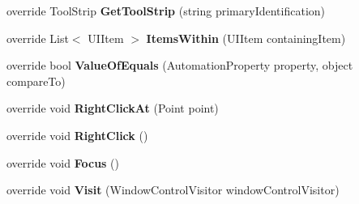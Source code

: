 \begin{DoxyCompactItemize}
\item 
\hypertarget{class_proto_test_1_1_golem_1_1_white_1_1_elements_1_1_white_group_box_a5552ee58d6ee1cba644c05b8be0002fe}{override Tool\-Strip {\bfseries Get\-Tool\-Strip} (string primary\-Identification)}\label{class_proto_test_1_1_golem_1_1_white_1_1_elements_1_1_white_group_box_a5552ee58d6ee1cba644c05b8be0002fe}

\item 
\hypertarget{class_proto_test_1_1_golem_1_1_white_1_1_elements_1_1_white_group_box_a7e122903b49b4a13e8490163f43d9711}{override List$<$ U\-I\-Item $>$ {\bfseries Items\-Within} (U\-I\-Item containing\-Item)}\label{class_proto_test_1_1_golem_1_1_white_1_1_elements_1_1_white_group_box_a7e122903b49b4a13e8490163f43d9711}

\item 
\hypertarget{class_proto_test_1_1_golem_1_1_white_1_1_elements_1_1_white_group_box_ac233cfda25110a0ec987804ae56582fc}{override bool {\bfseries Value\-Of\-Equals} (Automation\-Property property, object compare\-To)}\label{class_proto_test_1_1_golem_1_1_white_1_1_elements_1_1_white_group_box_ac233cfda25110a0ec987804ae56582fc}

\item 
\hypertarget{class_proto_test_1_1_golem_1_1_white_1_1_elements_1_1_white_group_box_a3fd780fb88f4722204829f3c32b9a308}{override void {\bfseries Right\-Click\-At} (Point point)}\label{class_proto_test_1_1_golem_1_1_white_1_1_elements_1_1_white_group_box_a3fd780fb88f4722204829f3c32b9a308}

\item 
\hypertarget{class_proto_test_1_1_golem_1_1_white_1_1_elements_1_1_white_group_box_a08d6fbf0ceaada342423fef9c532c026}{override void {\bfseries Right\-Click} ()}\label{class_proto_test_1_1_golem_1_1_white_1_1_elements_1_1_white_group_box_a08d6fbf0ceaada342423fef9c532c026}

\item 
\hypertarget{class_proto_test_1_1_golem_1_1_white_1_1_elements_1_1_white_group_box_a24514413c37b9f18a4030ea98ef929b8}{override void {\bfseries Focus} ()}\label{class_proto_test_1_1_golem_1_1_white_1_1_elements_1_1_white_group_box_a24514413c37b9f18a4030ea98ef929b8}

\item 
\hypertarget{class_proto_test_1_1_golem_1_1_white_1_1_elements_1_1_white_group_box_a5b6c33c059d322c634f026b99a47790f}{override void {\bfseries Visit} (Window\-Control\-Visitor window\-Control\-Visitor)}\label{class_proto_test_1_1_golem_1_1_white_1_1_elements_1_1_white_group_box_a5b6c33c059d322c634f026b99a47790f}


\end{DoxyCompactItemize}
